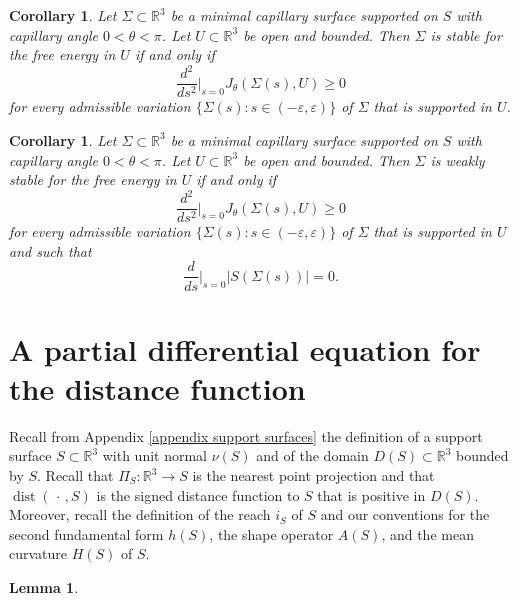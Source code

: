 \documentclass[11pt]{amsart}
\newtheorem{lem}[prop]{Lemma}
\newtheorem{coro}[prop]{Corollary}
\begin{document}
\begin{appendices}
\begin{coro} 
	Let $\Sigma\subset \mathbb{R}^3$ be a minimal capillary surface supported on $S$ with capillary angle $0<\theta<\pi$. Let $U\subset \mathbb{R}^3$ be open and bounded. Then $\Sigma$ is stable for the free energy in $U$ if and only if 
	$$
	\frac{d^2}{ds^2}\bigg|_{s=0}J_\theta(\Sigma(s),U)\geq 0
	$$ 
	for every admissible variation $\{\Sigma(s):s\in(-\varepsilon,\varepsilon)\}$ of $\Sigma$ that is supported in $U$. 
\end{coro}

\begin{coro} \label{weakly stable and second derivative test}
	Let $\Sigma\subset \mathbb{R}^3$ be a minimal capillary surface supported on $S$ with capillary angle $0<\theta<\pi$. Let $U\subset \mathbb{R}^3$ be open and bounded. Then $\Sigma$ is weakly stable for the free energy in $U$ if and only if 
	$$
\frac{d^2}{ds^2}\bigg|_{s=0}J_\theta(\Sigma(s),U)\geq 0
	$$ 
	for every admissible variation $\{\Sigma(s):s\in(-\varepsilon,\varepsilon)\}$ of $\Sigma$ that is supported in $U$ and such that 
	$$
	\frac{d}{ds}\bigg|_{s=0}|S(\Sigma(s))|=0.
	$$
\end{coro}

\section{A partial differential equation for the distance function}
	Recall from Appendix \ref{appendix support surfaces} the definition of a support surface $S\subset \mathbb{R}^3$ with unit normal $\nu(S)$  and of the domain $D(S)\subset \mathbb{R}^3$ bounded by $S$.  Recall that $\Pi_S:\mathbb{R}^3\to S$ is the nearest point projection and that $\operatorname{dist}(\,\cdot\,,S)$ is the signed distance function to $S$ that is positive in $D(S)$. Moreover, recall the definition of the reach $i_S$ of $S$ and our conventions for the second fundamental form $h(S)$, the shape operator $A(S)$, and the mean curvature $H(S)$ of $S$.


	\begin{lem} \label{distance super harmonic}
		


\end{lem}
\end{appendices}
\end{document}
